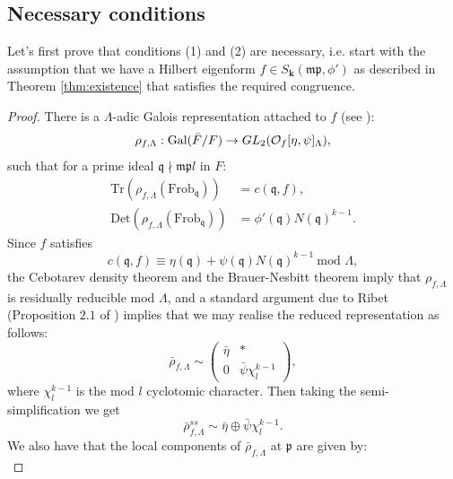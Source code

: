 \documentclass[a4paper,oneside]{amsart}
\theoremstyle{plain}
\theoremstyle{definition}
\begin{document}
\subsection{Necessary conditions}
Let's first prove that conditions (1) and (2) are necessary, i.e. start with the assumption that we have a Hilbert eigenform $f\in S_{\textbf{k}}(\mathfrak{mp},\phi')$ as described in Theorem \ref{thm:existence} that satisfies the required congruence.
\begin{proof}
There is a $\Lambda$-adic Galois representation attached to $f$ (see \cite{taylor}):
\begin{equation*}
    \rho_{f, \Lambda}: \text{Gal}(\Bar{F}/F) \rightarrow GL_2(\mathcal{O}_{f}[\eta, \psi]_{\Lambda}),
\end{equation*}
such that for a prime ideal $\mathfrak{q} \nmid \mathfrak{mp}l$ in $F$:
\begin{align*}
    \text{Tr}(\rho_{f, \Lambda}(\text{Frob}_\mathfrak{q})) &=  c(\mathfrak{q},f), \\
    \text{Det}(\rho_{f, \Lambda}(\text{Frob}_\mathfrak{q})) &= \phi'(\mathfrak{q})N(\mathfrak{q})^{k-1}.
\end{align*}
    Since $f$ satisfies 
    \begin{equation*}
        c(\mathfrak{q}, f) \equiv \eta(\mathfrak{q})+ \psi(\mathfrak{q})N(\mathfrak{q})^{k-1} \ \text{mod } \Lambda,
    \end{equation*}
    the Cebotarev density theorem and the Brauer-Nesbitt theorem imply that $\rho_{f,\Lambda}$ is residually reducible mod $\Lambda$, and a standard argument due to Ribet (Proposition $2.1$ of \cite{ribet}) implies that we may realise the reduced representation as follows:
    \begin{equation*}
        \bar{\rho}_{f, \Lambda} \sim \left(\begin{matrix}
            \bar{\eta} & * \\ 0 & \bar{\psi}\chi_l^{k-1}
        \end{matrix}\right),
    \end{equation*}
    where $\chi_l^{k-1}$ is the mod $l$ cyclotomic character. Then taking the semi-simplification we get
    \begin{equation*}
        \bar{\rho}_{f, \Lambda}^{ss} \sim \bar{\eta} \oplus \bar{\psi}\chi_l^{k-1}.
    \end{equation*}
    We also have that the local components of $\bar{\rho}_{f,\Lambda}$ at $\mathfrak{p}$ are given by:
    \begin{equation*}

\end{equation*}
\end{proof}
\end{document}
